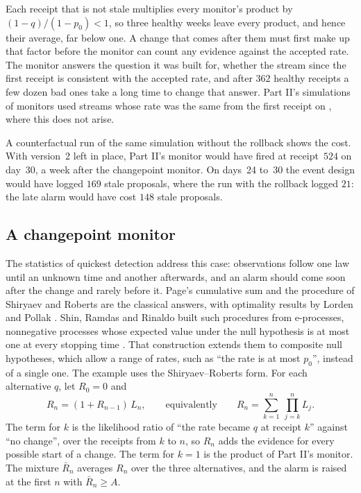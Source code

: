 \documentclass[11pt]{article}
\theoremstyle{definition}
\theoremstyle{plain}
\begin{document}
Each receipt that is not stale multiplies every monitor's product by $(1-q)/(1-p_0)<1$, so three
healthy weeks leave every product, and hence their average, far below one. A change that comes
after them must first make up that factor before the monitor can count any evidence against the
accepted rate. The monitor answers the question it was built for, whether the stream since the
first receipt is consistent with the accepted rate, and after $362$ healthy receipts a few dozen
bad ones take a long time to change that answer. Part II's simulations of monitors used streams
whose rate was the same from the first receipt on \cite[Section~5.5]{part2}, where this does not
arise.

A counterfactual run of the same simulation without the rollback shows the cost. With version~2
left in place, Part II's monitor would have fired at receipt~$524$ on day~30, a week after the
changepoint monitor. On days~24 to~30 the event design would have logged $169$ stale proposals,
where the run with the rollback logged $21$: the late alarm would have cost $148$ stale proposals.

\subsection{A changepoint monitor}\label{sec:sr}

The statistics of quickest detection address this case: observations follow one law until an
unknown time and another afterwards, and an alarm should come soon after the change and rarely
before it. Page's cumulative sum \cite{page} and the procedure of Shiryaev and Roberts
\cite{shiryaev,roberts} are the classical answers, with optimality results by Lorden \cite{lorden}
and Pollak \cite{pollak}. Shin, Ramdas and Rinaldo built such procedures from e-processes,
nonnegative processes whose expected value under the null hypothesis is at most one at every
stopping time \cite{shin}. That construction extends them to composite null hypotheses, which allow
a range of rates, such as ``the rate is at most $p_0$'', instead of a single one. The example uses
the Shiryaev--Roberts form. For each alternative $q$, let $R_0=0$ and
\[
R_n=(1+R_{n-1})\,L_n,\qquad\text{equivalently}\qquad
R_n=\sum_{k=1}^{n}\ \prod_{j=k}^{n}L_j .
\]
The term for $k$ is the likelihood ratio of ``the rate became $q$ at receipt $k$'' against ``no
change'', over the receipts from $k$ to $n$, so $R_n$ adds the evidence for every possible start of
a change. The term for $k=1$ is the product of Part II's monitor. The mixture $\bar R_n$ averages
$R_n$ over the three alternatives, and the alarm is raised at the first $n$ with $\bar R_n\ge A$.
\end{document}
